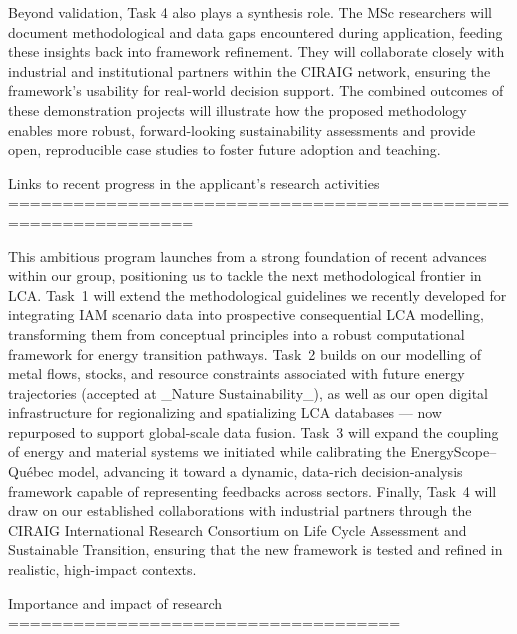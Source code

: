 \documentclass[compact]{nserc} %
\begin{document}
\begin{markdown}
Beyond validation, Task 4 also plays a synthesis role. The MSc researchers will document methodological and data gaps encountered during application, feeding these insights back into framework refinement. They will collaborate closely with industrial and institutional partners within the CIRAIG network, ensuring the framework’s usability for real-world decision support. The combined outcomes of these demonstration projects will illustrate how the proposed methodology enables more robust, forward-looking sustainability assessments and provide open, reproducible case studies to foster future adoption and teaching.



Links to recent progress in the applicant's research activities
===============================================================

This ambitious program launches from a strong foundation of recent advances within our group, positioning us to tackle the next methodological frontier in LCA. Task~1 will extend the methodological guidelines we recently developed for integrating IAM scenario data into prospective consequential LCA modelling, transforming them from conceptual principles into a robust computational framework for energy transition pathways. Task~2 builds on our modelling of metal flows, stocks, and resource constraints associated with future energy trajectories (accepted at _Nature Sustainability_), as well as our open digital infrastructure for regionalizing and spatializing LCA databases --- now repurposed to support global-scale data fusion. Task~3 will expand the coupling of energy and material systems we initiated while calibrating the EnergyScope–Québec model, advancing it toward a dynamic, data-rich decision-analysis framework capable of representing feedbacks across sectors. Finally, Task~4 will draw on our established collaborations with industrial partners through the CIRAIG International Research Consortium on Life Cycle Assessment and Sustainable Transition, ensuring that the new framework is tested and refined in realistic, high-impact contexts.


Importance and impact of research
====================================


\end{markdown}
\end{document}
